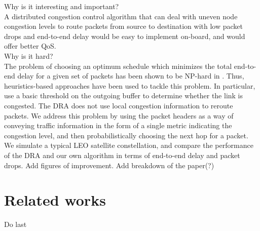 \documentclass[10pt,conference, draft, letterpaper]{IEEEtran}
\newcommand{\rough}[1]{{\color{red} #1}}
\begin{document}
\rough{Why is it interesting and important?}\\
A distributed congestion control algorithm that can deal with uneven node congestion levels to route packets from source to destination with low packet drops and end-to-end delay would be easy to implement on-board, and would offer better QoS. \\
\rough{Why is it hard?}\\
The problem of choosing an optimum schedule which minimizes the total end-to-end delay for a given set of packets has been shown to be NP-hard in \cite{opt_schedule}. Thus, heuristics-based approaches have been used to tackle this problem. In particular, \cite{ekici-datagram}\cite{ekici-dist} use a basic threshold on the outgoing buffer to determine whether the link is congested. The DRA does not use local congestion information to reroute packets. We address this problem by using the packet headers as a way of conveying traffic information in the form of a single metric indicating the congestion level, and then probabilistically choosing the next hop for a packet. We simulate a typical LEO satellite constellation, and compare the performance of the DRA and our own algorithm in terms of end-to-end delay and packet drops. \rough{Add figures of improvement. Add breakdown of the paper(?)}
\section{Related works}
\rough{Do last}
\end{document}
